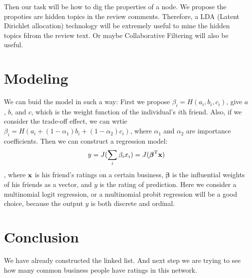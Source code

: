 \documentclass[11pt]{article} %
\newcommand{\Tr}{^{\rm T}}
\newcommand{\x}{{\bf x}}
\newcommand{\bbeta}{\boldsymbol{\beta}}
\newcommand{\1}{{\bf 1}}
\newcommand{\0}{{\bf 0}}
\begin{document}
Then our task will be how to dig the properties of a node. We propose the propoties are hidden topics in the review comments. Therefore, a LDA (Latent Dirichlet allocation) technology will be extremely useful to mine the hidden topics fdrom the review text. Or maybe Collaborative Filtering will also be useful.

\section{Modeling}
We can buid the model in such a way: First we propose $ \beta_{i}=H(a_{i}, b_{i}, c_{i}) $, give $ a $, $ b $, and $ c $, which is the weight function of the individual's $ i $th friend. Also, if we consider the trade-off effect, we can wrtie $ \beta_{i}=H(a_{i}+(1-\alpha_{1})b_{i}+(1-\alpha_{2})c_{i}) $, where $ \alpha_{1} $ and $ \alpha_{2} $ are importance coefficients. Then we can construct a regression model: $$ y= J(\sum\limits_{i}\beta_{i}x_{i})=J(\bbeta\Tr\x)$$, where $ \x $ is his friend's ratings on a certain business, $ \bbeta $ is the influential weights of his friends as a vector, and $ y $ is the rating of prediction. Here we consider a multinomial logit regression, or a multinomial probit regression will be a good choice, because the output $ y $ is both discrete and ordinal.

\section{Conclusion}
We have already constructed the linked list. And next step we are trying to see how many common business people have ratings in this network.




\end{document}
